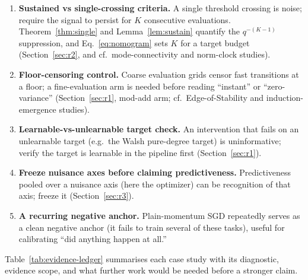 \documentclass[11pt]{article}
\theoremstyle{plain}
\theoremstyle{definition}
\begin{document}
\begin{enumerate}
\item \textbf{Sustained vs single-crossing criteria.} A single threshold crossing is
  noise; require the signal to persist for $K$ consecutive evaluations. Theorem~\ref{thm:single}
  and Lemma~\ref{lem:sustain} quantify the $q^{-(K-1)}$ suppression, and
  Eq.~\eqref{eq:nomogram} sets $K$ for a target budget (Section~\ref{sec:r2}, and cf.\
  mode-connectivity and norm-clock studies).
\item \textbf{Floor-censoring control.} Coarse evaluation grids censor fast transitions at
  a floor; a fine-evaluation arm is needed before reading ``instant'' or ``zero-variance''
  (Section~\ref{sec:r1}, mod-add arm; cf.\ Edge-of-Stability \citep{cohen2021eos} and induction-emergence studies).
\item \textbf{Learnable-vs-unlearnable target check.} An intervention that fails on an
  unlearnable target (e.g.\ the Walsh pure-degree target) is uninformative; verify the
  target is learnable in the pipeline first (Section~\ref{sec:r1}).
\item \textbf{Freeze nuisance axes before claiming predictiveness.} Predictiveness pooled
  over a nuisance axis (here the optimizer) can be recognition of that axis; freeze it
  (Section~\ref{sec:r3}).
\item \textbf{A recurring negative anchor.} Plain-momentum SGD repeatedly serves as a clean
  negative anchor (it fails to train several of these tasks), useful for calibrating ``did
  anything happen at all.''
\end{enumerate}
Table~\ref{tab:evidence-ledger} summarises each case study with its diagnostic, evidence scope, and what further work would be needed before a stronger claim.
\end{document}
